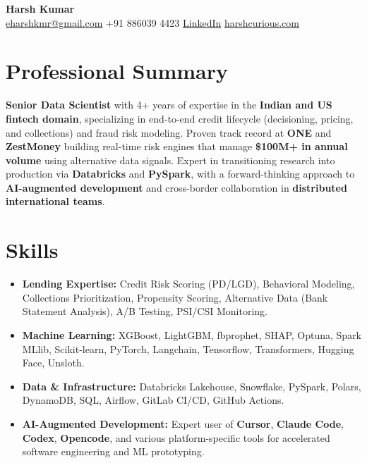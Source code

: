 \documentclass[10pt, letterpaper]{article}
\begin{document}
\pagestyle{empty}

\begin{center}
    {\Huge \textbf{Harsh Kumar}} \\[1.2ex]
    \href{mailto:eharshkmr@gmail.com}{eharshkmr@gmail.com} \textbar{} +91 886039 4423 \textbar{} \href{https://linkedin.com/in/harsh-kumar-a7b98198}{LinkedIn} \textbar{} \href{https://harshcurious.com}{harshcurious.com}
\end{center}

\section*{Professional Summary}
\textbf{Senior Data Scientist} with 4+ years of expertise in the \textbf{Indian and US fintech domain}, specializing in end-to-end credit lifecycle (decisioning, pricing, and collections) and fraud risk modeling. Proven track record at \textbf{ONE} and \textbf{ZestMoney} building real-time risk engines that manage \textbf{\$100M+ in annual volume} using alternative data signals. Expert in transitioning research into production via \textbf{Databricks} and \textbf{PySpark}, with a forward-thinking approach to \textbf{AI-augmented development} and cross-border collaboration in \textbf{distributed international teams}.

\section*{Skills}
\begin{itemize}[leftmargin=0.15in, label={}]
    \item \textbf{Lending Expertise:} Credit Risk Scoring (PD/LGD), Behavioral Modeling, Collections Prioritization, Propensity Scoring, Alternative Data (Bank Statement Analysis), A/B Testing, PSI/CSI Monitoring.
    \item \textbf{Machine Learning:} XGBoost, LightGBM, fbprophet, SHAP, Optuna, Spark MLlib, Scikit-learn, PyTorch, Langchain, Tensorflow, Transformers, Hugging Face, Unsloth.
    \item \textbf{Data \& Infrastructure:} Databricks Lakehouse, Snowflake, PySpark, Polars, DynamoDB, SQL, Airflow, GitLab CI/CD, GitHub Actions.
    \item \textbf{AI-Augmented Development:} Expert user of \textbf{Cursor}, \textbf{Claude Code}, \textbf{Codex}, \textbf{Opencode}, and various platform-specific tools for accelerated software engineering and ML prototyping.
\end{itemize}
\end{document}
